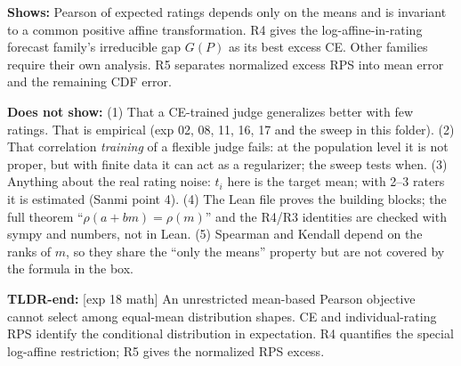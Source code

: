 \documentclass[11pt]{article}
\begin{document}
\normalsize\textbf{Shows:} Pearson of expected ratings depends only on the means and is invariant to a common positive affine transformation. R4 gives the log-affine-in-rating forecast family’s irreducible gap $G(P)$ as its best excess CE. Other families require their own analysis. R5 separates normalized excess RPS into mean error and the remaining CDF error.

\textbf{Does not show:} (1) That a CE-trained judge generalizes better with few ratings. That is empirical (exp 02, 08, 11, 16, 17 and the sweep in this folder). (2) That correlation \emph{training} of a flexible judge fails: at the population level it is not proper, but with finite data it can act as a regularizer; the sweep tests when. (3) Anything about the real rating noise: $t_i$ here is the target mean; with 2--3 raters it is estimated (Sanmi point 4). (4) The Lean file proves the building blocks; the full theorem ``$\rho(a+bm)=\rho(m)$'' and the R4/R3 identities are checked with sympy and numbers, not in Lean. (5) Spearman and Kendall depend on the ranks of $m$, so they share the ``only the means'' property but are not covered by the formula in the box.

\textbf{TLDR-end:} [exp 18 math] An unrestricted mean-based Pearson objective cannot select among equal-mean distribution shapes. CE and individual-rating RPS identify the conditional distribution in expectation. R4 quantifies the special log-affine restriction; R5 gives the normalized RPS excess.
\end{document}
